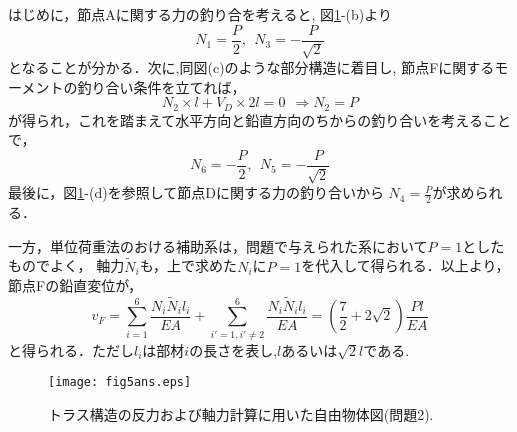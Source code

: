 \documentclass[10pt,a4j]{jarticle}
\begin{document}
はじめに，節点Aに関する力の釣り合を考えると, 図\ref{fig:fig5}-(b)より
\[
	N_1=\frac{P}{2}, \ \ N_3=-\frac{P}{\sqrt{2}}
\]
となることが分かる．次に,同図(c)のような部分構造に着目し,
節点Fに関するモーメントの釣り合い条件を立てれば，
\[
	N_2\times l +V_D\times 2l=0 \ \ \Rightarrow N_2=P 
\]
が得られ，これを踏まえて水平方向と鉛直方向のちからの釣り合いを考えることで，
\[
	N_6=-\frac{P}{2}, \ \ N_5=-\frac{P}{\sqrt{2}}
\]
最後に，図\ref{fig:fig5}-(d)を参照して節点Dに関する力の釣り合いから
$N_4=\frac{P}{2}$が求められる．

一方，単位荷重法のおける補助系は，問題で与えられた系において$P=1$としたものでよく，
軸力$\tilde N_i$も，上で求めた$N_i$に$P=1$を代入して得られる．以上より，
節点Fの鉛直変位が，
\[
	v_F=
	\sum_{i=1}^6\frac{N_i\tilde N_il_i}{EA}
	+
	\sum_{i'=1,i'\neq 2}^6\frac{N_i\tilde N_il_i}{EA}
	=\left(\frac{7}{2}+2\sqrt{2}\right)\frac{Pl}{EA}
\]
と得られる．ただし$l_i$は部材$i$の長さを表し,$l$あるいは$\sqrt{2}l$である.
\begin{figure}[h]
	\begin{center}
	\texttt{[image: fig5ans.eps]} 
	\end{center}
	\caption{トラス構造の反力および軸力計算に用いた自由物体図(問題2).}
	\label{fig:fig5}
\end{figure}
\end{document}
